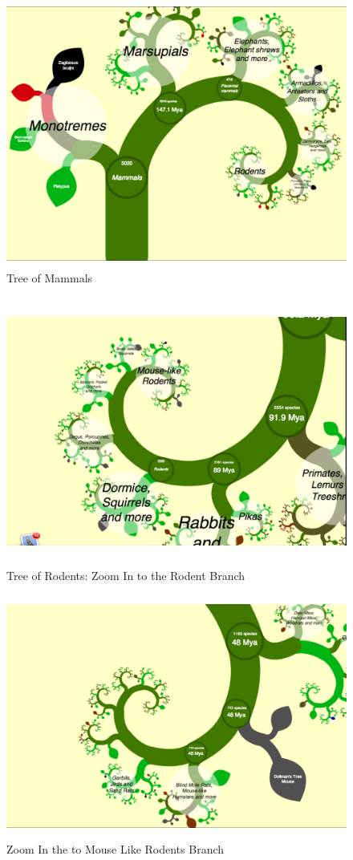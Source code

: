\documentclass[MSc]{icldt}
\begin{document}
\begin{figure}[H]
  \centering
  \includegraphics [width=15cm,height=8.8cm]{Mammal}
  \caption{Tree of Mammals}
  \label{fig:mammal}
\end{figure}

\begin{figure}[H]
  \centering
  \includegraphics [width=15cm,height=8.8cm]{Rodent}
  \caption{Tree of Rodents: Zoom In to the Rodent Branch}
  \label{fig:rodent}
\end{figure}

\begin{figure}[H]
  \centering
  \includegraphics [width=15cm,height=8cm]{MouseLikeRodent}
  \caption{Zoom In the to Mouse Like Rodents Branch}
  \label{fig:mouseLikeRodent}
\end{figure}
\end{document}
